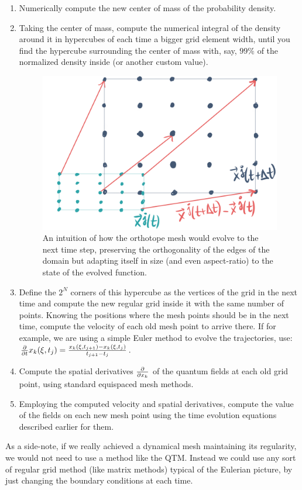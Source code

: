 \documentclass[11pt, a4paper]{article} %
\begin{document}
\begin{enumerate}
\item Numerically compute the new center of mass of the probability density.
\item Taking the center of mass, compute the numerical integral of the density around it in hypercubes of each time a bigger grid element width, until you find the hypercube surrounding the center of mass with, say, $99\%$ of the normalized density inside (or another custom value).
\begin{figure}[h!]
  \centering
    \includegraphics[width=0.45\linewidth]{9orthotope.png}
  \caption{ An intuition of how the orthotope mesh would evolve to the next time step, preserving the orthogonality of the edges of the domain but adapting itself in size (and even aspect-ratio) to the state of the evolved function. }
  \label{fig:ortho}
\end{figure}
\item Define the $2^N$ corners of this hypercube as the vertices of the grid in the next time and compute the new regular grid inside it with the same number of points. Knowing the positions where the mesh points should be in the next time, compute the velocity of each old mesh point to arrive there. If for example, we are using a simple Euler method to evolve the trajectories, use: $\pdv{}{t}x_k(\xi,t_{j})=\frac{x_k(\xi,t_{j+1})-x_k(\xi,t_{j})}{t_{j+1}-t_j}$.
\item Compute the spatial derivatives $\pdv{}{x_k}$ of the quantum fields at each old grid point, using standard equispaced mesh methods.
\item Employing the computed velocity and spatial derivatives, compute the value of the fields on each new mesh point using the time evolution equations described earlier for them.
\end{enumerate}

As a side-note, if we really achieved a dynamical mesh maintaining its regularity, we would not need to use a method like the QTM. Instead we could use any sort of regular grid method (like matrix methods) typical of the Eulerian picture, by just changing the boundary conditions at each time.
\end{document}
